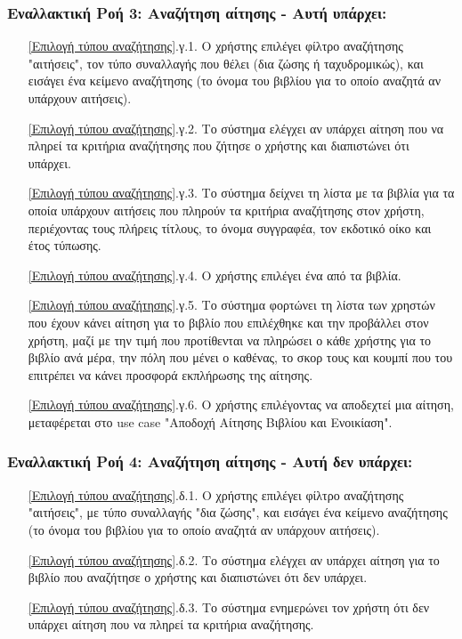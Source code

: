 \documentclass[12pt,a4paper]{article}
\begin{document}
\subsubsection*{Εναλλακτική Ροή 3: Αναζήτηση αίτησης - Αυτή υπάρχει:}
\begin{enumerate}
    \item[\ref{Επιλογή τύπου αναζήτησης}.γ.1.] Ο χρήστης επιλέγει φίλτρο αναζήτησης "αιτήσεις", τον τύπο συναλλαγής που θέλει (δια ζώσης ή ταχυδρομικώς), και εισάγει ένα κείμενο αναζήτησης (το όνομα του βιβλίου για το οποίο αναζητά αν υπάρχουν αιτήσεις).
    \item[\ref{Επιλογή τύπου αναζήτησης}.γ.2.] Το σύστημα ελέγχει αν υπάρχει αίτηση που να πληρεί τα κριτήρια αναζήτησης που ζήτησε ο χρήστης και διαπιστώνει ότι υπάρχει.
    \item[\ref{Επιλογή τύπου αναζήτησης}.γ.3.] Το σύστημα δείχνει τη λίστα με τα βιβλία για τα οποία υπάρχουν αιτήσεις που πληρούν τα κριτήρια αναζήτησης στον χρήστη, περιέχοντας τους πλήρεις τίτλους, το όνομα συγγραφέα, τον εκδοτικό οίκο και έτος τύπωσης.
    \item[\ref{Επιλογή τύπου αναζήτησης}.γ.4.] Ο χρήστης επιλέγει ένα από τα βιβλία.
    \item[\ref{Επιλογή τύπου αναζήτησης}.γ.5.] Το σύστημα φορτώνει τη λίστα των χρηστών που έχουν κάνει αίτηση για το βιβλίο που επιλέχθηκε και την προβάλλει στον χρήστη, μαζί με την τιμή που προτίθενται να πληρώσει ο κάθε χρήστης για το βιβλίο ανά μέρα, την πόλη που μένει ο καθένας, το σκορ τους και κουμπί που του επιτρέπει να κάνει προσφορά εκπλήρωσης της αίτησης.
    \item[\ref{Επιλογή τύπου αναζήτησης}.γ.6.] Ο χρήστης επιλέγοντας να αποδεχτεί μια αίτηση, μεταφέρεται στο use case "Αποδοχή Αίτησης Βιβλίου και Ενοικίαση".
\end{enumerate}

\subsubsection*{Εναλλακτική Ροή 4: Αναζήτηση αίτησης - Αυτή δεν υπάρχει:}
\begin{enumerate}
    \item[\ref{Επιλογή τύπου αναζήτησης}.δ.1.] Ο χρήστης επιλέγει φίλτρο αναζήτησης "αιτήσεις", με τύπο συναλλαγής "δια ζώσης", και εισάγει ένα κείμενο αναζήτησης (το όνομα του βιβλίου για το οποίο αναζητά αν υπάρχουν αιτήσεις).
    \item[\ref{Επιλογή τύπου αναζήτησης}.δ.2.] Το σύστημα ελέγχει αν υπάρχει αίτηση για το βιβλίο που αναζήτησε ο χρήστης και διαπιστώνει ότι δεν υπάρχει.
    \item[\ref{Επιλογή τύπου αναζήτησης}.δ.3.] Το σύστημα ενημερώνει τον χρήστη ότι δεν υπάρχει αίτηση που να πληρεί τα κριτήρια αναζήτησης.
\end{enumerate}
\end{document}
